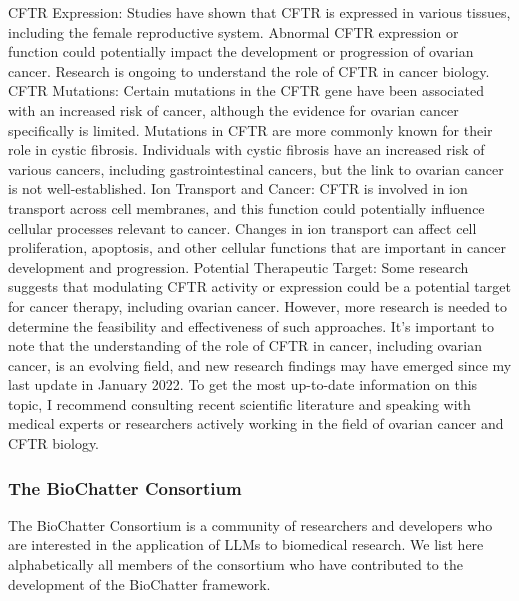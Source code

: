 CFTR Expression: Studies have shown that CFTR is expressed in various tissues, including the female reproductive system. Abnormal CFTR expression or function could potentially impact the development or progression of ovarian cancer. Research is ongoing to understand the role of CFTR in cancer biology.
CFTR Mutations: Certain mutations in the CFTR gene have been associated with an increased risk of cancer, although the evidence for ovarian cancer specifically is limited. Mutations in CFTR are more commonly known for their role in cystic fibrosis. Individuals with cystic fibrosis have an increased risk of various cancers, including gastrointestinal cancers, but the link to ovarian cancer is not well-established.
Ion Transport and Cancer: CFTR is involved in ion transport across cell membranes, and this function could potentially influence cellular processes relevant to cancer. Changes in ion transport can affect cell proliferation, apoptosis, and other cellular functions that are important in cancer development and progression.
Potential Therapeutic Target: Some research suggests that modulating CFTR activity or expression could be a potential target for cancer therapy, including ovarian cancer. However, more research is needed to determine the feasibility and effectiveness of such approaches.
It's important to note that the understanding of the role of CFTR in cancer, including ovarian cancer, is an evolving field, and new research findings may have emerged since my last update in January 2022. To get the most up-to-date information on this topic, I recommend consulting recent scientific literature and speaking with medical experts or researchers actively working in the field of ovarian cancer and CFTR biology.

\hypertarget{the-biochatter-consortium}{%
\subsubsection{The BioChatter Consortium}\label{the-biochatter-consortium}}

The BioChatter Consortium is a community of researchers and developers who are interested in the application of LLMs to biomedical research.
We list here alphabetically all members of the consortium who have contributed to the development of the BioChatter framework.

